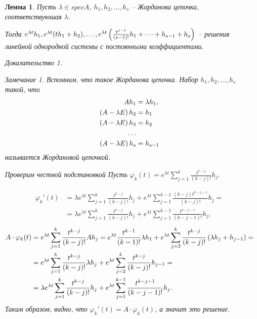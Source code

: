 \documentclass[a5paper, 10pt]{article}
\theoremstyle{definition}
\theoremstyle{plain}
\newtheorem{Lem}{Лемма}
\theoremstyle{remark}
\newtheorem*{Note}{Замечание}
\newtheorem*{Proof}{Доказательство}
\begin{document}
	\begin{Lem}
		Пусть $\lambda\in spec A$, $h_1, h_2, \dots, h_s$ -- Жорданова цепочка, соответствуюшая $\lambda$. 
		
		Тогда $e^{\lambda t}h_1, e^{\lambda t} (th_1+h_2), \dots, e^{\lambda t} \left(\frac{t^{s-1}}{(s-1)!} h_1 + \dots + h_{s-1} + h_s\right)$ -- решения линейной однородной системы с постоянными коэффициентами.
		\begin{Proof}
			\begin{Note}
				Вспомним, что такое Жорданова цепочка.
				Набор $h_1, h_2, \dots, h_s$ такой, что 
				\[
				\begin{split}
				Ah_1 &= \lambda h_1,\\
				\left(A-\lambda E\right) h_2 &= h_1\\
				\left(A-\lambda E\right) h_3 &= h_2\\
				\dots \\
				\left(A-\lambda E\right) h_s &= h_{s-1}\\
				\end{split}
				\]
				называется Жордановой цепочкой.
			\end{Note}
		
			Проверим честной подстановкой
			Пусть $\varphi_k(t) = e^{\lambda t} \sum\limits_{j=1}^k \frac{t^{k-j}}{(k-j)!}h_j$. 
			
			\[
			\begin{split}
			\varphi_k'(t) &= \lambda e^{\lambda t} \sum\limits_{j=1}^k \frac{t^{k-j}}{(k-j)!}h_j + e^{\lambda t} \sum\limits_{j=1}^{k-1} \frac{(k-j)t^{k-j-1}}{(k-j)!}h_j = \\
			&=\lambda e^{\lambda t} \sum\limits_{j=1}^k \frac{t^{k-j}}{(k-j)!}h_j + e^{\lambda t} \sum\limits_{j=1}^{k-1} \frac{t^{k-j-1}}{(k-j-1)!}h_j,
			\end{split}
			\]
			\[
			\begin{split}
				A \cdot \varphi_k(t) &= e^{\lambda t} \sum\limits_{j=1}^k \frac{t^{k-j}}{(k-j)!}A h_j = e^{\lambda t} \frac{t^{k-1}}{(k-1)!}\lambda h_1 + e^{\lambda t} \sum\limits_{j=2}^k \frac{t^{k-j}}{(k-j)!} \left(\lambda h_j + h_{j-1}\right)  =\\
				&= e^{\lambda t} \sum\limits_{j=1}^k \frac{t^{k-j}}{(k-j)!}\lambda h_j + e^{\lambda t} \sum\limits_{j=2}^k \frac{t^{k-j}}{(k-j)!}h_{j-1} = \\
				&=  \lambda e^{\lambda t} \sum\limits_{j=1}^k \frac{t^{k-j}}{(k-j)!} h_j + e^{\lambda t} \sum\limits_{j=1}^{k-1} \frac{t^{k-j-1}}{(k-j-1)!}h_{j}.
			\end{split}
			\]
			Таким образом, видно, что $\varphi_k'(t) = A\cdot \varphi_k(t)$, а значит это решение.
		\end{Proof}
	\end{Lem}
\end{document}
